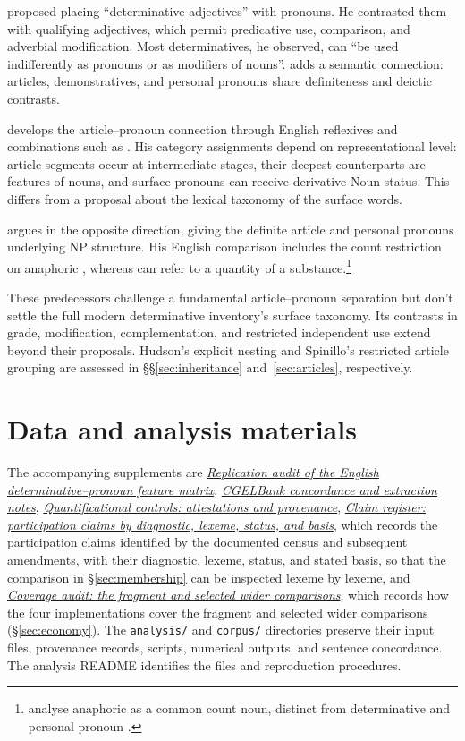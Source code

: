 \documentclass[12pt]{article}
\begin{document}
\textcite[24]{palmer1924} proposed placing \enquote{determinative adjectives} with pronouns. He contrasted them with qualifying adjectives, which permit predicative use, comparison, and adverbial modification. Most determinatives, he observed, can \enquote{be used indifferently as pronouns or as modifiers of nouns}. \textcite[279]{lyons1968} adds a semantic connection: articles, demonstratives, and personal pronouns share definiteness and deictic contrasts.

\textcite{postal1966} develops the article--pronoun connection through English reflexives and combinations such as . His category assignments depend on representational level: article segments occur at intermediate stages, their deepest counterparts are features of nouns, and surface pronouns can receive derivative Noun status. This differs from a proposal about the lexical taxonomy of the surface words.

\textcite[197--203]{sommerstein1972} argues in the opposite direction, giving the definite article and personal pronouns underlying NP structure. His English comparison includes the count restriction on anaphoric , whereas  can refer to a quantity of a substance.\footnote{\textcite[797--798]{payne2013anaphoric} analyse anaphoric  as a common count noun, distinct from determinative  and personal pronoun .}

These predecessors challenge a fundamental article--pronoun separation but don't settle the full modern determinative inventory's surface taxonomy. Its contrasts in grade, modification, complementation, and restricted independent use extend beyond their proposals. Hudson's explicit nesting and Spinillo's restricted article grouping are assessed in §§\ref{sec:inheritance} and~\ref{sec:articles}, respectively.

\section*{Data and analysis materials}

The accompanying supplements are \href{run:matrix-audit.pdf}{\textit{Replication audit of the English determinative--pronoun feature matrix}}, \href{run:corpus-documentation.pdf}{\textit{CGELBank concordance and extraction notes}}, \href{run:quantifier-controls.pdf}{\textit{Quantificational controls: attestations and provenance}}, \href{run:claim-register.pdf}{\textit{Claim register: participation claims by diagnostic, lexeme, status, and basis}}, which records the participation claims identified by the documented census and subsequent amendments, with their diagnostic, lexeme, status, and stated basis, so that the comparison in §\ref{sec:membership} can be inspected lexeme by lexeme, and \href{run:coverage-audit.pdf}{\textit{Coverage audit: the fragment and selected wider comparisons}}, which records how the four implementations cover the fragment and selected wider comparisons (§\ref{sec:economy}). The \texttt{analysis/} and \texttt{corpus/} directories preserve their input files, provenance records, scripts, numerical outputs, and sentence concordance. The analysis README identifies the files and reproduction procedures.

\clearpage
\printbibliography
\end{document}
